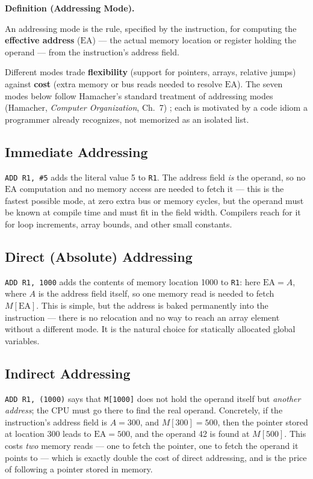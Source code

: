 \documentclass[11pt]{article}
\newenvironment{definitionbox}[1]{%
  \par\noindent\textbf{Definition (#1).}\ \itshape
}{\par\vspace{0.3em}}
\begin{document}
\begin{definitionbox}{Addressing Mode}
An addressing mode is the rule, specified by the instruction, for computing the \textup{\textbf{effective address}} ($\text{EA}$) --- the actual memory location or register holding the operand --- from the instruction's address field.
\end{definitionbox}

Different modes trade \textbf{flexibility} (support for pointers, arrays, relative jumps) against \textbf{cost} (extra memory or bus reads needed to resolve $\text{EA}$). The seven modes below follow Hamacher's standard treatment of addressing modes (Hamacher, \textit{Computer Organization}, Ch.~7) \cite{Hamacher2002_computer_organization}; each is motivated by a code idiom a programmer already recognizes, not memorized as an isolated list.

\subsection{Immediate Addressing}

\texttt{ADD R1, \#5} adds the literal value 5 to \texttt{R1}. The address field \emph{is} the operand, so no $\text{EA}$ computation and no memory access are needed to fetch it --- this is the fastest possible mode, at zero extra bus or memory cycles, but the operand must be known at compile time and must fit in the field width. Compilers reach for it for loop increments, array bounds, and other small constants.

\subsection{Direct (Absolute) Addressing}

\texttt{ADD R1, 1000} adds the contents of memory location 1000 to \texttt{R1}: here $\text{EA} = A$, where $A$ is the address field itself, so one memory read is needed to fetch $M[\text{EA}]$. This is simple, but the address is baked permanently into the instruction --- there is no relocation and no way to reach an array element without a different mode. It is the natural choice for statically allocated global variables.

\subsection{Indirect Addressing}

\texttt{ADD R1, (1000)} says that \texttt{M[1000]} does not hold the operand itself but \emph{another address}; the CPU must go there to find the real operand. Concretely, if the instruction's address field is $A = 300$, and $M[300] = 500$, then the pointer stored at location 300 leads to $\text{EA} = 500$, and the operand 42 is found at $M[500]$. This costs \emph{two} memory reads --- one to fetch the pointer, one to fetch the operand it points to --- which is exactly double the cost of direct addressing, and is the price of following a pointer stored in memory.
\end{document}
